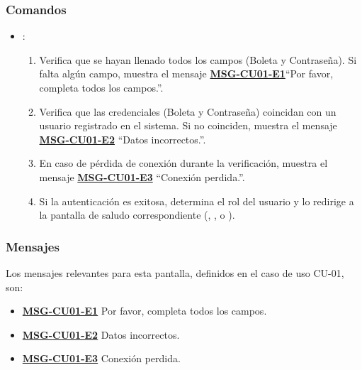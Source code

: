 	\subsubsection{Comandos}
	\begin{itemize}
		\item {}:
		\begin{enumerate}
			\item Verifica que se hayan llenado todos los campos (Boleta y Contraseña). Si falta algún campo, muestra el mensaje \textbf{\hyperref[msg:CU01-E1]{MSG-CU01-E1}}{``Por favor, completa todos los campos.''}.
			\item Verifica que las credenciales (Boleta y Contraseña) coincidan con un usuario registrado en el sistema. Si no coinciden, muestra el mensaje \textbf{\hyperref[msg:CU01-E2]{MSG-CU01-E2}} ``Datos incorrectos.''.
			\item En caso de pérdida de conexión durante la verificación, muestra el mensaje \textbf{\hyperref[msg:CU01-E3]{MSG-CU01-E3}} ``Conexión perdida.''.
			\item Si la autenticación es exitosa, determina el rol del usuario y lo redirige a la pantalla de saludo correspondiente (, ,  o ).
		\end{enumerate}
		
	\end{itemize}
	
	\subsubsection{Mensajes}
	Los mensajes relevantes para esta pantalla, definidos en el caso de uso CU-01, son:
	\begin{itemize}
		\item \textbf{\hyperref[msg:CU01-E1]{MSG-CU01-E1}} Por favor, completa todos los campos.
		\item \textbf{\hyperref[msg:CU01-E2]{MSG-CU01-E2}} Datos incorrectos.
		\item \textbf{\hyperref[msg:CU01-E3]{MSG-CU01-E3}} Conexión perdida.
	\end{itemize}


